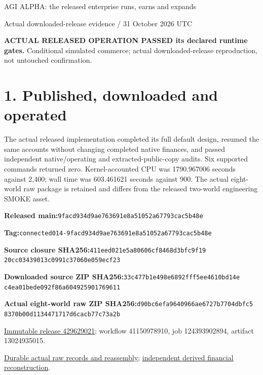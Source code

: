 \documentclass[10pt,letterpaper]{article}
\begin{document}
{\LARGE AGI ALPHA: the released enterprise runs, earns and expands}\par
{\large Actual downloaded-release evidence / 31 October 2026 UTC}\par
\colorbox{green!8}{\parbox{0.96\linewidth}{\textbf{ACTUAL RELEASED OPERATION PASSED its declared runtime gates.} Conditional simulated commerce; actual downloaded-release reproduction, not untouched confirmation.}}
\section*{1. Published, downloaded and operated}
The actual released implementation completed its full default design, resumed the same accounts without changing completed native finances, and passed independent native/operating and extracted-public-copy audits. Six supported commands returned zero. Kernel-accounted CPU was 1790.967006 seconds against 2,400; wall time was 603.461621 seconds against 900. The actual eight-world raw package is retained and differs from the released two-world engineering SMOKE asset.
\par\small\textbf{Released main:}\;\texttt{9facd934d9ae763691e8a51052a67793cac5b48e}\par\textbf{Tag:}\;\texttt{connected014-9facd934d9ae763691e8a51052a67793cac5b48e}\par\textbf{Source closure SHA256:}\;\texttt{411eed021e5a80606cf8468d3bfc9f19}\\\texttt{20cc03439013c0991c37060e059ecf23}\par\textbf{Downloaded source ZIP SHA256:}\;\texttt{33c477b1e498e6892fff5ee4610bd14e}\\\texttt{c4ea01bede092f86a604925901769611}\par\textbf{Actual eight-world raw ZIP SHA256:}\;\texttt{d90bc6efa9640966ae6727b7704dbfc5}\\\texttt{8370b00d1134471717d6cacb77c73a2b}\normalsize
\par\href{https://github.com/MontrealAI/AGI-Alpha-Invention-Flywheel-Lab/releases/tag/connected014-9facd934d9ae763691e8a51052a67793cac5b48e}{Immutable release 429629021}; workflow 41150978910, job 124393902894, artifact 13024935015.
\par\href{https://github.com/MontrealAI/AGI-Alpha-Invention-Flywheel-Lab/tree/060144c6ab79d08d7acf191ee1c9991384046c1e/evidence/completion015/actual-release-9fac}{Durable actual raw records and reassembly}; \href{https://github.com/MontrealAI/AGI-Alpha-Invention-Flywheel-Lab/blob/060144c6ab79d08d7acf191ee1c9991384046c1e/evidence/completion015/actual-release-9fac/FINANCIAL_RECONSTRUCTION.json}{independent derived financial reconstruction}.\par
\end{document}
